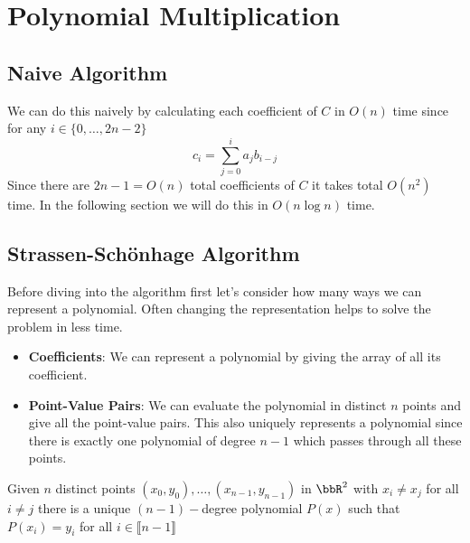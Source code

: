 \chapter{Polynomial Multiplication}
\begin{algoprob}
\end{algoprob}
\section{Naive Algorithm}
We can do this naively by calculating each coefficient of $C$ in $O(n)$ time since for any $i\in\{0,\dots, 2n-2\}$ $$c_i=\sum_{j=0}^ia_jb_{i-j}$$Since there are $2n-1=O(n)$ total coefficients of $C$ it takes total $O(n^2)$ time. In the following section we will do this in $O(n\log n)$ time.
\section{Strassen-Sch\"{o}nhage Algorithm}
Before diving into the algorithm first let's consider how many ways we can represent a polynomial. Often changing the representation helps to solve the problem in less time.\begin{itemize}
	\item \textbf{Coefficients}: We can represent a polynomial by giving the array of all its coefficient.
	\item \textbf{Point-Value Pairs}: We can evaluate the polynomial in distinct $n$ points and give all the point-value pairs. This also uniquely represents a polynomial since there is exactly one polynomial of degree $n-1$ which passes through all these points.
\end{itemize}
\begin{Theorem}{}{}
	Given $n$ distinct points $(x_0,y_0),\dots, (x_{n-1},y_{n-1})$ in $\bbR^2$ with $x_i\neq x_j$ for all $i\neq j$ there is a unique $(n-1)-$degree polynomial $P(x)$ such that $P(x_i)=y_i$ for all $i\in \llbracket n-1\rrbracket$
\end{Theorem}
\parinn

